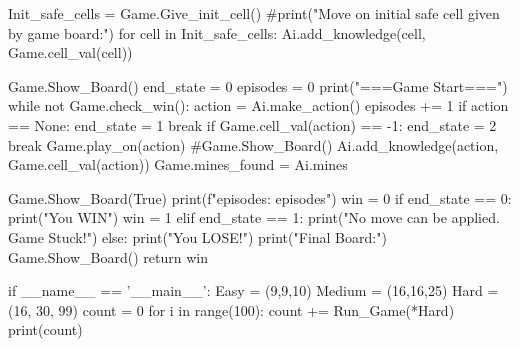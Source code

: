 \documentclass{article} %
\begin{document}
\begin{code}
    Init_safe_cells = Game.Give_init_cell()
    #print("Move on initial safe cell given by game board:")
    for cell in Init_safe_cells:
        Ai.add_knowledge(cell, Game.cell_val(cell))

    Game.Show_Board()
    end_state = 0
    episodes = 0
    print("===Game Start===")
    while not Game.check_win():
        action = Ai.make_action()
        episodes += 1
        if action == None:
            end_state = 1
            break
        if Game.cell_val(action) == -1:
            end_state = 2
            break
        Game.play_on(action)
        #Game.Show_Board()
        Ai.add_knowledge(action, Game.cell_val(action))
        Game.mines_found = Ai.mines
        
        
    Game.Show_Board(True)
    print(f"episodes: {episodes}")
    win = 0
    if end_state == 0:
        print("You WIN")
        win = 1
    elif end_state == 1:
        print("No move can be applied. Game Stuck!")
    else:
        print("You LOSE!")
    print("Final Board:")
    Game.Show_Board()
    return win


if __name__ == '__main__':
    Easy = (9,9,10)
    Medium = (16,16,25)
    Hard = (16, 30, 99)
    count = 0
    for i in range(100):
        count += Run_Game(*Hard)
    print(count)
\end{code}
\end{document}
